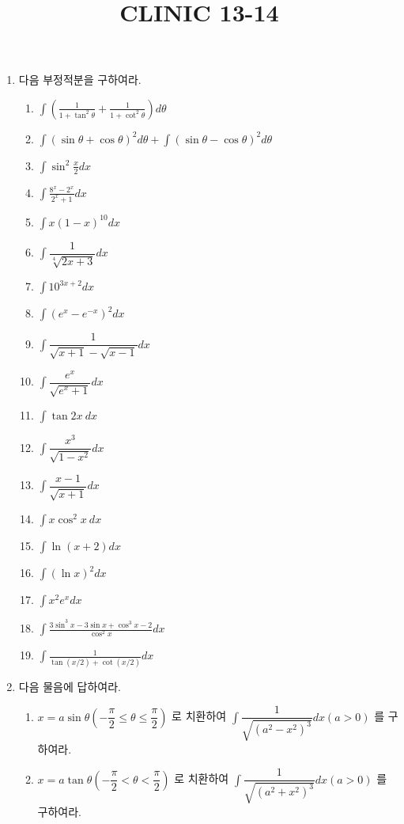 \documentclass[12pt, a4paper]{article}
\title{CLINIC 13-14}
\begin{document}
\maketitle

\begin{enumerate}
\item 다음 부정적분을 구하여라.
   \begin{enumerate}[label=(\arabic*)] 
    \item $\displaystyle \int \left( \frac{1}{1+\tan^{2}\theta} + \frac{1}{1+\cot^{2}\theta} \right) d\theta$
    \item $\displaystyle \int (\sin\theta+\cos\theta)^{2}d\theta + \int (\sin\theta-\cos\theta)^{2}d\theta$
    \item $\displaystyle \int \sin^2 \frac{x}{2} dx$
    \item $\displaystyle \int \frac{8^x - 2^x}{2^x + 1} dx$
    \item $\int x(1-x)^{10}dx$
    \item $\int\dfrac{1}{\sqrt[4]{2x+3}}dx$
    \item $\int10^{3x+2}dx$
    \item $\int(e^{x}-e^{-x})^{2}dx$
    \item $\int\dfrac{1}{\sqrt{x+1}-\sqrt{x-1}}dx$
    \item $\int\dfrac{e^{x}}{\sqrt{e^{x}+1}}dx$
    \item $\int\tan 2x~dx$
    \item $\int\dfrac{x^{3}}{\sqrt{1-x^{2}}}dx$
    \item $\int\dfrac{x-1}{\sqrt{x+1}}dx$
    \item $\int x\cos^{2}x~dx$
    \item $\int \ln(x+2)dx$
    \item $\int(\ln x)^{2}dx$
    \item $\int x^{2}e^{x}dx$
    \item $\displaystyle \int\frac{3 \sin^{3}x-3 \sin x+\cos^{3}x-2}{\cos^{2}x}dx$
    \item $\displaystyle \int\frac{1}{\tan(x/2)+\cot(x/2)}dx$
  \end{enumerate}

\item 다음 물음에 답하여라.
\begin{enumerate}[label=(\arabic*)]
    \item $x=a\sin\theta(-\dfrac{\pi}{2}\le\theta\le\dfrac{\pi}{2})$ 로 치환하여 $\int\dfrac{1}{\sqrt{(a^{2}-x^{2})^{3}}}dx(a>0)$ 를 구하여라.
    \item $x=a\tan\theta(-\dfrac{\pi}{2}<\theta<\dfrac{\pi}{2})$ 로 치환하여 $\int\dfrac{1}{\sqrt{(a^{2}+x^{2})^{3}}}dx(a>0)$ 를 구하여라.
\end{enumerate}


\end{enumerate}
\end{document}
